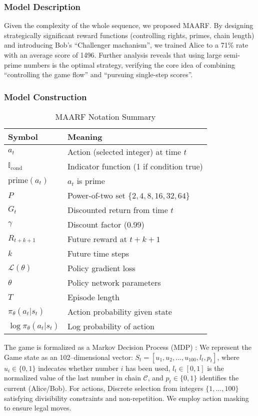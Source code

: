 \documentclass[twocolumn, a4paper]{article}
\begin{document}
\subsubsection{Model Description}
Given the complexity of the whole sequence, we proposed MAARF. By designing strategically significant reward functions (controlling rights, primes, chain length) and introducing Bob's ``Challenger machanism'', we trained Alice to a 71\% rate with an average score of 1496. Further analysis reveals that using large semi-prime numbers is the optimal strategy, verifying the core idea of combining ``controlling the game flow'' and ``pursuing single-step scores''.

\subsubsection{Model Construction}
\begin{table}[h]
\centering
\scriptsize
\caption{MAARF Notation Summary}
\begin{tabular}{@{}ll@{}}
\toprule
\textbf{Symbol} & \textbf{Meaning} \\
\midrule
$a_t$ & Action (selected integer) at time $t$ \\
$\mathbb{I}_{\text{cond}}$ & Indicator function (1 if condition true) \\
$\text{prime}(a_t)$ & $a_t$ is prime \\
$P$ & Power-of-two set $\{2,4,8,16,32,64\}$ \\
$G_t$ & Discounted return from time $t$ \\
$\gamma$ & Discount factor (0.99) \\
$R_{t+k+1}$ & Future reward at $t+k+1$ \\
$k$ & Future time steps \\
$\mathcal{L}(\theta)$ & Policy gradient loss \\
$\theta$ & Policy network parameters \\
$T$ & Episode length \\
$\pi_\theta(a_t|s_t)$ & Action probability given state \\
$\log\pi_\theta(a_t|s_t)$ & Log probability of action \\
\bottomrule
\end{tabular}
\end{table}
The game is formalized as a Markov Decision Process (MDP) \textsuperscript{\cite{sutton2018reinforcement}}:
We represent the Game state as an 102--dimensional vector: $S_t=[u_1, u_2, \dots, u_{100}, l_t, p_t]$, where $u_i\in \{0, 1\}$ indecates whether number $i$ has been used, $l_t\in [0,1]$ is the normalized value of the last number in chain $\mathcal{C}$, and $p_t\in \{0, 1\}$ identifies the current (Alice/Bob).
For actions, Discrete selection from integers $\{1,...,100\}$ satisfying divisibility constraints and non-repetition. We employ action masking to ensure legal moves.
\end{document}
